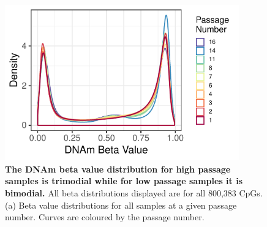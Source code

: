 \documentclass[a4paper]{article}
\begin{document}
\begin{figure}
\includegraphics[width=0.90\textwidth]{../figs/Passage_all_CpGs.pdf}
\caption{\textbf{The DNAm beta value distribution for high passage samples is trimodial while for low passage samples it is bimodial.} All beta distributions displayed are for all  800,383 CpGs. (a) Beta value distributions for all samples at a given passage number. Curves are coloured by the passage number.}
\end{figure}

\end{document}

